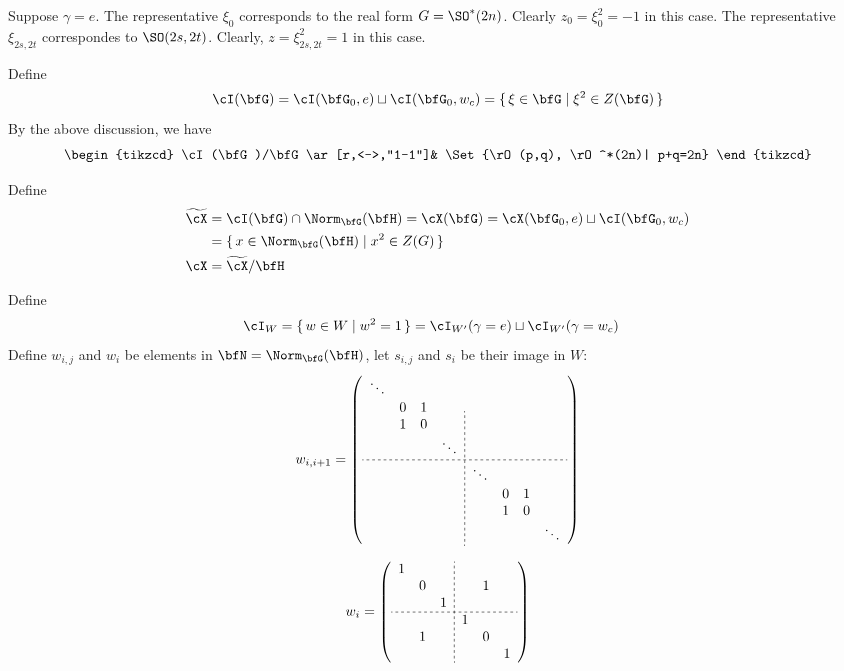 \documentclass[12pt,a4paper]{amsart}
\numberwithin{equation}{section}
\theoremstyle{remark}
\begin{document}
Suppose $\gamma=e$.  The representative $\xi_0$ corresponds to the real form
$G=\SO^*(2n)$. Clearly $z_0 = \xi_0^2 = -1$ in this case.  The representative
$\xi_{2s,2t}$ correspondes to $\SO(2s,2t)$. Clearly, $z = \xi_{2s,2t}^2=1$ in
this case.

Define
\[
  \cI(\bfG) = \cI(\bfG_0,e)\sqcup \cI(\bfG_0, w_c) = \set{\xi\in \bfG| \xi^2\in
    Z(\bfG)}
\]
By the above discussion, we have
\[
  \begin{tikzcd}
    \cI(\bfG)/\bfG \ar[r,<->,"1-1"]& \Set{\rO(p,q), \rO^*(2n)| p+q=2n}
  \end{tikzcd}
\]

Define
\[
  \begin{split}
    \tcX &= \cI(\bfG)\cap \Norm_{\bfG}(\bfH) = \cX(\bfG) = \cX(\bfG_0,e)\sqcup
    \cI(\bfG_0,w_c)\\
    & = \set{x\in \Norm_{\bfG}(\bfH)|x^2\in Z(G)}\\
    \cX &= \tcX/\bfH
  \end{split}
\]

Define
\[
  \begin{split}
    \cI_W &= \set{w\in W|w^2 =1} = \cI_{W'}(\gamma=e)\sqcup \cI_{W'}(\gamma=w_c)
  \end{split}
\]
Define $w_{i,j}$ and $w_{i}$ be elements in $\bfN = \Norm_{\bfG}(\bfH)$, let
$s_{i,j}$ and $s_i$ be their image in $W$:
\[
  w_{i,i+1}= \left(
    \begin{array}{cccc;{2pt/2pt}cccc}
      \ddots &    &   &        &        &    &   &        \\
        & 0  & 1 &        &        &    &   &        \\
        & 1 & 0 &        &        &    &   &        \\
        &    &   & \ddots &        &    &   &        \\
      \hdashline[2pt/2pt]
        &    &   &        & \ddots &    &   &        \\
        &    &   &        &        & 0  & 1          \\
        &    &   &        &        & 1 & 0 &        \\
        &    &   &        &        &    &   & \ddots \\
    \end{array} 
  \right)
\]

\[
  w_{i}= \left(
    \begin{array}{ccc;{2pt/2pt}ccc}
      1   &   &    &    &        &           \\
        & 0   &  &      &      1  &           \\
        &   & 1  &    &        &           \\
      \hdashline[2pt/2pt]
        &   &    &  1 &        &           \\
        &  1  &  &      &      0  &           \\
        &   &    &    &        & 1         \\
    \end{array} 
  \right)
\]
\end{document}
